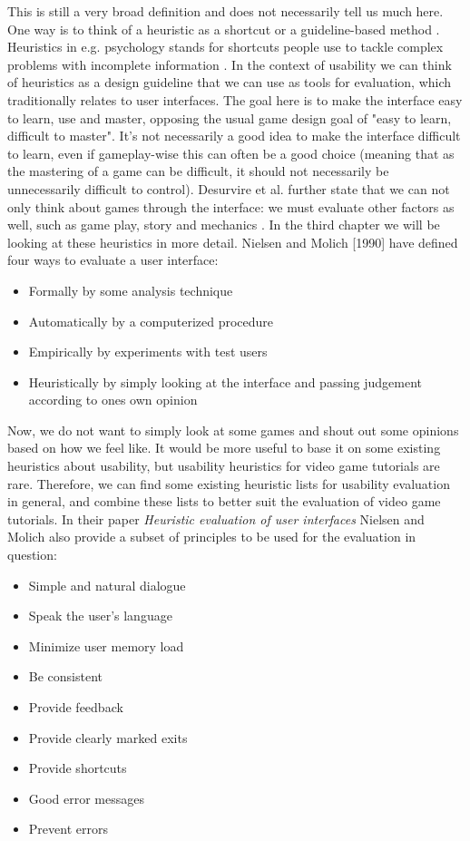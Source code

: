 This is still a very broad definition and does not necessarily tell us much here. One way is to think of a heuristic as a shortcut or a guideline-based method \cite{Isbister2008}. Heuristics in e.g. psychology stands for shortcuts people use to tackle complex problems with incomplete information \cite{Kahneman1982}. In the context of usability we can think of heuristics as a design guideline that we can use as tools for evaluation, which traditionally relates to user interfaces. The goal here is to make the interface easy to learn, use and master, opposing the usual game design goal of "easy to learn, difficult to master". \cite{Desurvire2004} It's not necessarily a good idea to make the interface difficult to learn, even if gameplay-wise this can often be a good choice (meaning that as the mastering of a game can be difficult, it should not necessarily be unnecessarily difficult to control). Desurvire et al. further state that we can not only think about games through the interface: we must evaluate other factors as well, such as game play, story and mechanics \cite{Desurvire2004}. In the third chapter we will be looking at these heuristics in more detail. Nielsen and Molich [1990] have defined four ways to evaluate a user interface: 

\begin{itemize}
\item Formally by some analysis technique
\item Automatically by a computerized procedure
\item Empirically by experiments with test users 
\item Heuristically by simply looking at the interface and passing judgement according to ones own opinion
\end{itemize}

Now, we do not want to simply look at some games and shout out some opinions based on how we feel like. It would be more useful to base it on some existing heuristics about usability, but usability heuristics for video game tutorials are rare. Therefore, we can find some existing heuristic lists for usability evaluation in general, and combine these lists to better suit the evaluation of video game tutorials. In their paper \textit{Heuristic evaluation of user interfaces} Nielsen and Molich also provide a subset of principles to be used for the evaluation in question: \cite{Nielsen1990}

\begin{itemize}
	\item Simple and natural dialogue
	\item Speak the user's language
	\item Minimize user memory load
	\item Be consistent
	\item Provide feedback
	\item Provide clearly marked exits
	\item Provide shortcuts
	\item Good error messages
	\item Prevent errors
\end{itemize}

